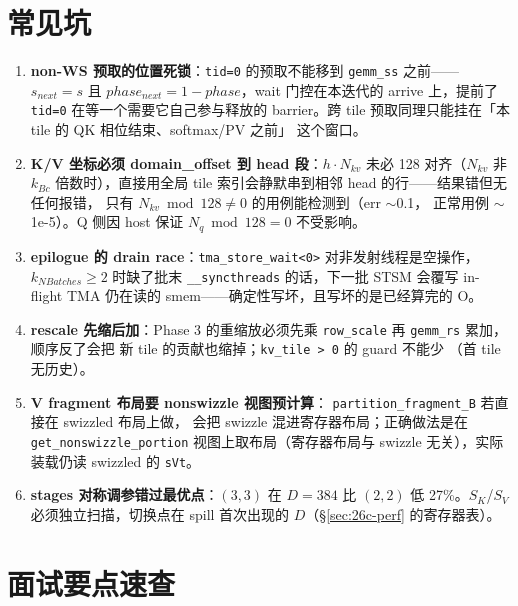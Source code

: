 \section{常见坑}\label{sec:26c-pitfalls}

\begin{enumerate}[itemsep=2pt]
  \item \textbf{non-WS 预取的位置死锁}：\texttt{tid=0} 的预取不能移到
        \texttt{gemm\_ss} 之前——$s_{next} = s$ 且 $phase_{next} =
        1{-}phase$，wait 门控在本迭代的 arrive 上，提前了
        \texttt{tid=0} 在等一个需要它自己参与释放的 barrier。跨 tile
        预取同理只能挂在「本 tile 的 QK 相位结束、softmax/PV 之前」
        这个窗口。
  \item \textbf{K/V 坐标必须 domain\_offset 到 head 段}：$h\cdot N_{kv}$
        未必 128 对齐（$N_{kv}$ 非 $k_{Bc}$ 倍数时），直接用全局
        tile 索引会静默串到相邻 head 的行——结果错但无任何报错，
        只有 $N_{kv} \bmod 128 \ne 0$ 的用例能检测到（err $\sim$0.1，
        正常用例 $\sim$1e-5）。Q 侧因 host 保证 $N_q \bmod 128 = 0$
        不受影响。
  \item \textbf{epilogue 的 drain race}：\texttt{tma\_store\_wait<0>}
        对非发射线程是空操作，$k_{NBatches}\ge2$ 时缺了批末
        \texttt{\_\_syncthreads} 的话，下一批 STSM 会覆写 in-flight
        TMA 仍在读的 smem——确定性写坏，且写坏的是已经算完的 O。
  \item \textbf{rescale 先缩后加}：Phase 3 的重缩放必须先乘
        \texttt{row\_scale} 再 \texttt{gemm\_rs} 累加，顺序反了会把
        新 tile 的贡献也缩掉；\texttt{kv\_tile > 0} 的 guard 不能少
        （首 tile 无历史）。
  \item \textbf{V fragment 布局要 nonswizzle 视图预计算}：
        \texttt{partition\_fragment\_B} 若直接在 swizzled 布局上做，
        会把 swizzle 混进寄存器布局；正确做法是在
        \texttt{get\_nonswizzle\_portion} 视图上取布局（寄存器布局与
        swizzle 无关），实际装载仍读 swizzled 的 \texttt{sVt}。
  \item \textbf{stages 对称调参错过最优点}：$(3,3)$ 在 $D{=}384$ 比
        $(2,2)$ 低 27\%。$S_K$/$S_V$ 必须独立扫描，切换点在 spill
        首次出现的 $D$（\S\ref{sec:26c-perf} 的寄存器表）。
\end{enumerate}

\section{面试要点速查}\label{sec:26c-interview}

